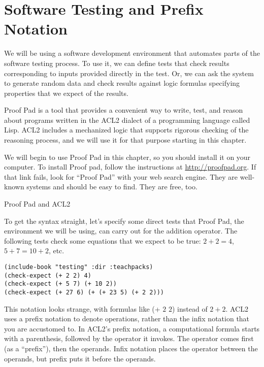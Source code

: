 \chapter{Software Testing and Prefix Notation}
\label{ch:software-testing-prefix-notation}


We will be using a software development environment that automates parts of the software testing process.
To use it, we can define tests that check results corresponding to inputs provided directly in the test.
Or, we can ask the system to generate random data and
check results against logic formulas specifying properties that we expect of the results.

\begin{aside}
Proof Pad is a tool that provides a convenient way
to write, test, and reason about programs
written in the ACL2 dialect of a programming language called Lisp.
ACL2 includes a mechanized logic that
supports rigorous checking of the reasoning process,
and we will use it for that purpose starting in this chapter.

We will begin to use Proof Pad in this chapter,
so you should install it on your computer.
To install Proof pad, follow the instructions at \url{http://proofpad.org}.
If that link fails, look for ``Proof Pad''
with your web search engine.
They are well-known systems and should be easy to find.
They are free, too.
\label{aside:proof-pad}
\caption{Proof Pad and ACL2}
\end{aside}

To get the syntax straight, let's specify some direct tests that Proof Pad,
the environment we will be using,
can carry out for the addition operator.
The following tests check some equations that we expect to be true:
$2 + 2 = 4$, $5 + 7 = 10 + 2$, etc.

\begin{Verbatim}
(include-book "testing" :dir :teachpacks)
(check-expect (+ 2 2) 4)
(check-expect (+ 5 7) (+ 10 2))
(check-expect (+ 27 6) (+ (+ 23 5) (+ 2 2)))
\end{Verbatim}

This notation looks strange, with formulas like (+ $2$ $2$) instead of $2 + 2$.
ACL2 uses a prefix notation
to denote operations,
rather than the infix notation
that you are accustomed to.
In ACL2's prefix notation, a computational formula starts with a parenthesis,
followed by the operator it invokes.
The operator comes first (as a ``prefix''), then the operands.
Infix notation places the operator between the operands,
but prefix puts it before the operands.

